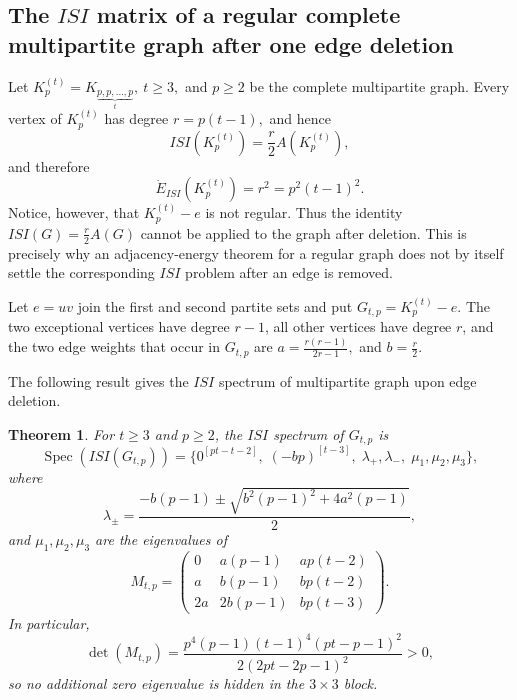 \documentclass[12pt,twoside]{article}
\newcommand{\spec}{\operatorname{Spec}}
\newtheorem{theorem}{Theorem}[section]
\begin{document}
\subsection{The $ISI$ matrix of a regular complete multipartite graph after one edge deletion}

Let
$K_{p}^{(t)}=K_{\underbrace{p,p,\ldots,p}_{t}},~ t\geq3,$ and $ p\geq2$ be the complete multipartite graph.
Every vertex of $K_p^{(t)}$ has degree
$
r=p(t-1),
$ and hence
$$
ISI(K_p^{(t)})=\frac{r}{2}A(K_p^{(t)}),
$$
and therefore
$$
\dot E_{ISI}(K_p^{(t)})=r^2=p^2(t-1)^2.
$$
Notice, however, that $K_p^{(t)}-e$ is not regular. Thus the identity $ISI(G)=\tfrac r2A(G)$ cannot be applied to the graph after deletion. This is precisely why an adjacency-energy theorem for a regular graph does not by itself settle the corresponding $ISI$ problem after an edge is removed.

Let $e=uv$ join the first and second partite sets and put
$
G_{t,p}=K_p^{(t)}-e.
$
The two exceptional vertices have degree $r-1$, all other vertices have degree $r$, and the two edge weights that occur in $G_{t,p}$ are
$a=\tfrac{r(r-1)}{2r-1},$ and $b=\tfrac r2.$


The following result gives the $ISI$ spectrum of multipartite graph upon edge deletion.
\begin{theorem}\label{thm:ISI-general-multipartite-minus-edge}
	For $t\geq3$ and $p\geq2$, the $ISI$ spectrum of $G_{t,p}$ is
	$$
	\spec(ISI(G_{t,p}))
	=
	\Big\{0^{[pt-t-2]},\;(-bp)^{[t-3]},\;\lambda_+,\lambda_-,\;\mu_1,\mu_2,\mu_3\Big\},
	$$
	where
	$$
	\lambda_{\pm}
	=
	\frac{-b(p-1)\pm\sqrt{b^2(p-1)^2+4a^2(p-1)}}{2},
	$$
	and $\mu_1,\mu_2,\mu_3$ are the eigenvalues of
	$$
	M_{t,p}=
	\begin{pmatrix}
		0&a(p-1)&ap(t-2)\\
		a&b(p-1)&bp(t-2)\\
		2a&2b(p-1)&bp(t-3)
	\end{pmatrix}.
	$$
	In particular,
	$$
	\det(M_{t,p})
	=
	\frac{p^4(p-1)(t-1)^4(pt-p-1)^2}{2(2pt-2p-1)^2}>0,
	$$
	so no additional zero eigenvalue is hidden in the $3\times3$ block.
\end{theorem}
\end{document}
